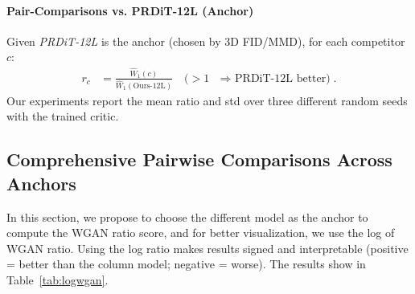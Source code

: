 \paragraph{Pair-Comparisons vs. PRDiT-12L (Anchor)}
Given \emph{PRDiT-12L} is the anchor (chosen by 3D FID/MMD), for each competitor $c$:
\begin{align}
r_c &= \frac{\widehat{W}_1(c)}{\widehat{W}_1(\text{Ours-12L})} \quad \text{(}{>}1 \text{ $\Rightarrow$ PRDiT-12L better)}.
\end{align}
Our experiments report the mean ratio and std over three different random seeds with the trained critic.
\subsection{Comprehensive Pairwise Comparisons Across Anchors}
\label{ap:wgan}
In this section, we propose to choose the different model as the anchor to compute the WGAN ratio score, and for better visualization, we use the log of WGAN ratio. Using the log ratio makes results signed and interpretable (positive = better than the column model; negative = worse). The results show in Table~\ref{tab:logwgan}.


